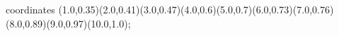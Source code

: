 					coordinates { (1.0,0.35)(2.0,0.41)(3.0,0.47)(4.0,0.6)(5.0,0.7)(6.0,0.73)(7.0,0.76)(8.0,0.89)(9.0,0.97)(10.0,1.0)};